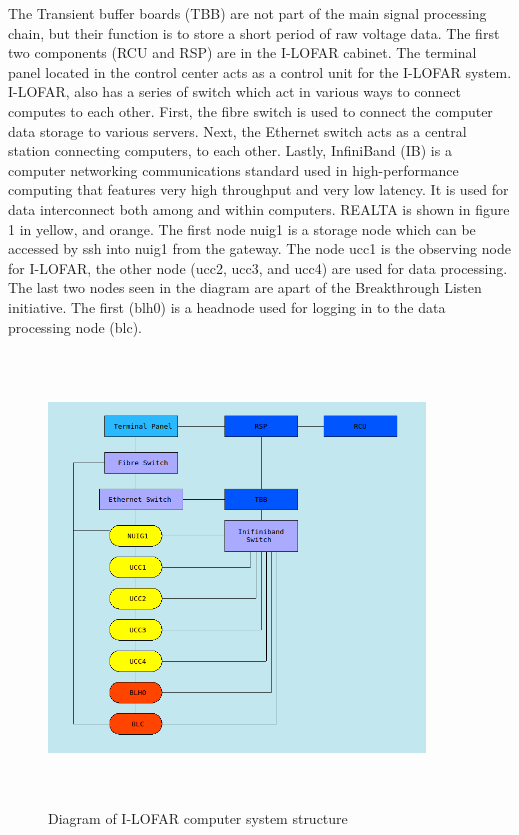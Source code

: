 \documentclass[11pt,fleqn]{book} %
\begin{document}
The Transient buffer boards (TBB) are not part of the main signal processing chain, but their function is to store a short period of raw voltage data. The first two components (RCU and RSP) are in the I-LOFAR cabinet. The terminal panel located in the control center acts as a control unit for the I-LOFAR system. I-LOFAR, also has a series of switch which act in various ways to connect computes to each other. First, the fibre switch is used to connect the computer data storage to various servers. Next, the Ethernet switch acts as a central station connecting computers, to each other. Lastly, InfiniBand (IB) is a computer networking communications standard used in high-performance computing that features very high throughput and very low latency. It is used for data interconnect both among and within computers. REALTA is shown in figure 1 in yellow, and orange. The first node nuig1 is a storage node which can be accessed by ssh into nuig1 from the gateway. The node ucc1 is the observing node for I-LOFAR, the other node (ucc2, ucc3, and ucc4) are used for data processing. The last two nodes seen in the diagram are apart of the Breakthrough Listen initiative. The first (blh0) is a headnode used for logging in to the data processing node (blc). 
%
\begin{figure}[h]
    \centering
    \includegraphics[width=10cm, height=12cm]{LOFAR.png}
    \caption{Diagram of I-LOFAR computer system structure}
    \label{fig:super}
\end{figure}
\end{document}
